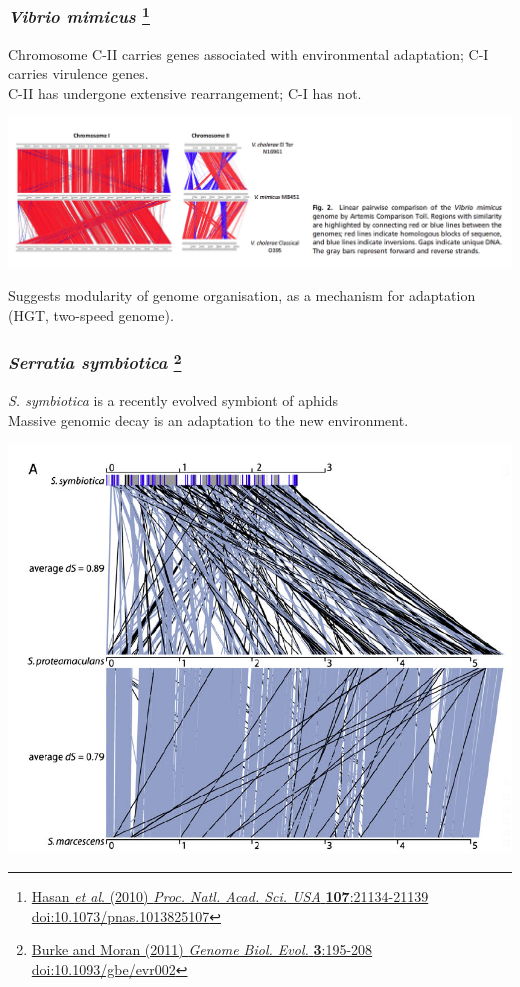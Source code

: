 \begin{frame}
  \frametitle{\textit{Vibrio mimicus} \footnote{\tiny{\href{http://dx.doi.org/10.1073/pnas.1013825107}{Hasan \textit{et al}. (2010) \textit{Proc. Natl. Acad. Sci. USA} \textbf{107}:21134-21139 doi:10.1073/pnas.1013825107}}}}
  Chromosome C-II carries genes associated with environmental adaptation; C-I carries virulence genes.\\
  C-II has undergone extensive rearrangement; C-I has not.\\
  \begin{center}
    \includegraphics[width=1\textwidth]{images/v_mimicus}
  \end{center}    
  Suggests modularity of genome organisation, as a mechanism for adaptation (HGT, two-speed genome).
\end{frame}

\begin{frame}
  \frametitle{\textit{Serratia symbiotica} \footnote{\tiny{\href{http://dx.doi.org/10.1093/gbe/evr002}{Burke and Moran (2011) \textit{Genome Biol. Evol.} \textbf{3}:195-208 doi:10.1093/gbe/evr002}}}}
  \textit{S. symbiotica} is a recently evolved symbiont of aphids\\
  Massive genomic decay is an adaptation to the new environment.\\
  \begin{center}
    \includegraphics[width=0.75\textheight]{images/s_symbiotica}
  \end{center}    
\end{frame}

